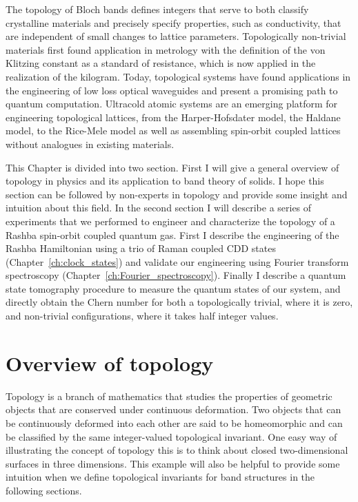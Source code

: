  The topology of Bloch bands defines integers that serve to both classify crystalline materials and precisely specify properties, such as conductivity, that are independent of small changes to lattice parameters\cite{hasan_colloquium:_2010}. Topologically non-trivial materials first found application in metrology with the definition of the von Klitzing constant as a standard of resistance, which is now applied in the realization of the kilogram\cite{newell_codata_2018}. Today, topological systems have found applications in the engineering of low loss optical waveguides\cite{ozawa_topological_2019} and present a promising path to quantum computation\cite{nayak_non-abelian_2008}. Ultracold atomic systems are an emerging platform for engineering topological lattices, from the Harper-Hofsdater model\cite{miyake_realizing_2013,aidelsburger_realization_2013}, the Haldane model\cite{jotzu_experimental_2014}, to the Rice-Mele model\cite{lu_geometrical_2016,lohse_thouless_2016} as well as assembling spin-orbit coupled lattices without analogues in existing materials\cite{wu_realization_2016,sun_highly_2018}.


This Chapter is divided into two section. First I will give a general overview of topology in physics and its application to band theory of solids. I hope this section can be followed by non-experts in topology and provide some insight and intuition about this field. In the second section I will describe a series of experiments that we performed to engineer and characterize the topology of a Rashba spin-orbit coupled quantum gas. First I describe the engineering of the Rashba Hamiltonian using a trio of Raman coupled CDD states (Chapter~\ref{ch:clock_states}) and validate our engineering using Fourier transform spectroscopy (Chapter~\ref{ch:Fourier_spectroscopy}). Finally I describe a quantum state tomography procedure to measure the quantum states of our system, and directly obtain the Chern number for both a topologically trivial, where it is zero, and non-trivial configurations, where it takes half integer values. 

\label{ch:Rashba}

\section{Overview of topology} 

Topology is a branch of mathematics that studies the properties of geometric objects that are conserved under continuous deformation. Two objects that can be continuously deformed into each other are said to be homeomorphic and can be classified by the same integer-valued topological invariant. One easy way of illustrating the concept of topology this is to think about closed two-dimensional surfaces in three dimensions. This example will also be helpful to provide some intuition when we define topological invariants for band structures in the following sections. 

